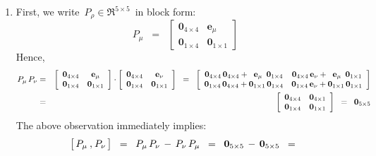 \begin{enumerate}
\item
	First, we write \,$P_{\rho} \in \Re^{5 \times 5}$\, in block form:
	\begin{equation*}
	P_{\mu}
	\;\; = \;\;
		\left[\begin{array}{cc}
			\mathbf{0}_{4 \times 4} & \mathbf{e}_{\mu}
			\\
			\mathbf{0}_{1 \times 4} & \mathbf{0}_{1 \times 1}
			\end{array}\right]
	\end{equation*}
	Hence,
	\begin{eqnarray*}
	P_{\mu}\,P_{\nu}
	& = &
		\left[\begin{array}{cc}
			\mathbf{0}_{4 \times 4} & \mathbf{e}_{\mu}
			\\
			\mathbf{0}_{1 \times 4} & \mathbf{0}_{1 \times 1}
			\end{array}\right]
		\cdot
		\left[\begin{array}{cc}
			\mathbf{0}_{4 \times 4} & \mathbf{e}_{\nu}
			\\
			\mathbf{0}_{1 \times 4} & \mathbf{0}_{1 \times 1}
			\end{array}\right]
	\;\; = \;\;
		\left[\begin{array}{cc}
			\mathbf{0}_{4 \times 4}\,\mathbf{0}_{4 \times 4} + {\color{white}..}\mathbf{e}_{\mu}{\color{white}1}\mathbf{0}_{1 \times 4}
			&
			\mathbf{0}_{4 \times 4}\,\mathbf{e}_{\nu} + {\color{white}..}\mathbf{e}_{\mu}{\color{white}1}\mathbf{0}_{1 \times 1}
			\\
			\mathbf{0}_{1 \times 4}\,\mathbf{0}_{4 \times 4} + \mathbf{0}_{1 \times 1}\,\mathbf{0}_{1 \times 4}
			&
			\mathbf{0}_{1 \times 4}\,\mathbf{e}_{\nu} + \mathbf{0}_{1 \times 1}\,\mathbf{0}_{1 \times 1}
			\end{array}\right]
	\\
	& = &
		\left[\begin{array}{cc}
			\mathbf{0}_{4 \times 4} & \mathbf{0}_{4 \times 1}
			\\
			\mathbf{0}_{1 \times 4} & \mathbf{0}_{1 \times 1}
			\end{array}\right]
	\;\; = \;\;
		\mathbf{0}_{5 \times 5}
	\end{eqnarray*}
	The above observation immediately implies:
	\begin{equation*}
	\left[\,P_{\mu}\,\overset{{\color{white}1}}{,}\,P_{\nu}\,\right]
	\;\; = \;\;
		P_{\mu}\,P_{\nu} \,-\, P_{\nu}\,P_{\mu}
	\;\; = \;\;
		\mathbf{0}_{5 \times 5} \,-\, \mathbf{0}_{5 \times 5}
	\;\; = \;\;

\end{equation*}
\end{enumerate}
